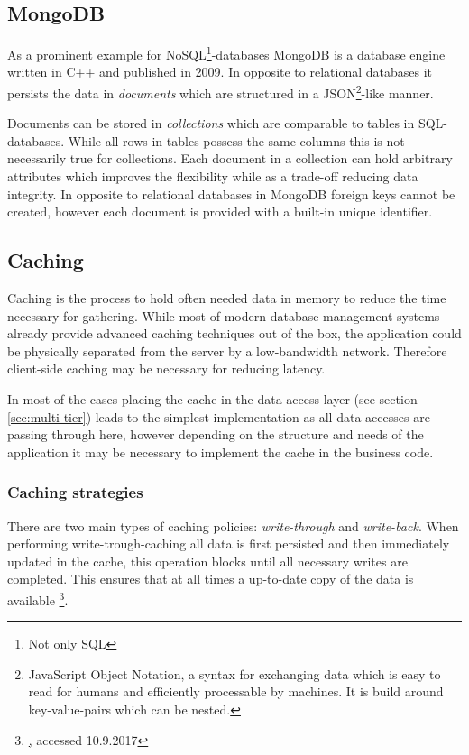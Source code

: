 \subsection{MongoDB}
As a prominent example for NoSQL\footnote{Not only SQL}-databases MongoDB is a database engine written in C++ and published in 2009. In opposite to relational databases it persists the data in \emph{documents} which are structured in a JSON\footnote{JavaScript Object Notation, a syntax for exchanging data which is easy to read for humans and efficiently processable by machines. It is build around key-value-pairs which can be nested.}-like manner. 

Documents can be stored in \emph{collections} which are comparable to tables in SQL-databases. While all rows in tables possess the same columns this is not necessarily true for collections. Each document in a collection can hold arbitrary attributes which improves the flexibility while as a trade-off reducing data integrity. In opposite to relational databases in MongoDB foreign keys cannot be created, however each document is provided with a built-in unique identifier.

\subsection{Caching}

Caching is the process to hold often needed data in memory to reduce the time necessary for gathering. While most of modern database management systems already provide advanced caching techniques out of the box, the application could be physically separated from the server by a low-bandwidth network. Therefore client-side caching may be necessary for reducing latency. 

In most of the cases placing the cache in the data access layer (see section \ref{sec:multi-tier}) leads to the simplest implementation as all data accesses are passing through here, however depending on the structure and needs of the application it may be necessary to implement the cache in the business code.

\subsubsection{Caching strategies}
There are two main types of caching policies: \emph{write-through} and \emph{write-back}. When performing write-trough-caching all data is first persisted and then immediately updated in the cache, this operation blocks until all necessary writes are completed. This ensures that at all times a up-to-date copy of the data is available \footnote{\href{http://searchsolidstatestorage.techtarget.com/answer/Comparing-write-through-write-back-and-write-around-caching}, accessed 10.9.2017}. 

